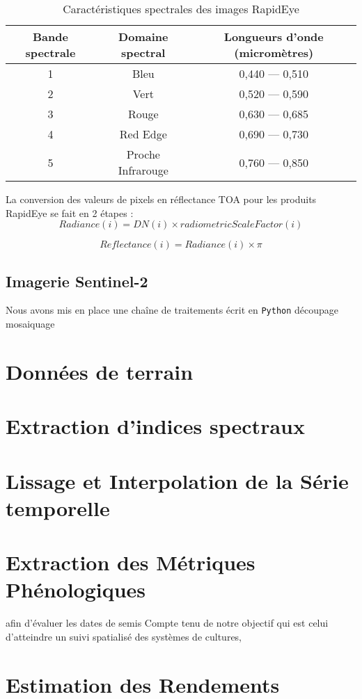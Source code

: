 \begin{table}
\begin{center}
\caption{Caractéristiques spectrales des images RapidEye}
\label{rapideye}
 \begin{tabular}{ccc}
  \hline
  Bande spectrale & Domaine spectral & Longueurs d'onde (micromètres)\\
  \hline
  1 & Bleu & 0,440 --- 0,510 \\
  2 & Vert & 0,520 --- 0,590 \\
  3 & Rouge & 0,630 --- 0,685 \\
  4 & Red Edge & 0,690 --- 0,730 \\ 
  5 & Proche Infrarouge & 0,760 --- 0,850 \\
  \hline
 \end{tabular}
\end{center}
\end{table}

La conversion des valeurs de pixels en réflectance TOA pour les produits RapidEye se fait en 2 étapes :
\[  Radiance (i) = DN(i) \times radiometricScaleFactor(i) \]

\[   Reflectance(i) = Radiance(i) \times \pi \]

  \subsection{Imagerie Sentinel-2}
 
\vspace{5mm}
 
Nous avons mis en place une chaîne de traitements écrit en \texttt{Python} découpage mosaiquage
  
\section{Données de terrain}
  
\section{Extraction d'indices spectraux}

\section{Lissage et Interpolation de la Série temporelle}

\section{Extraction des Métriques Phénologiques}
afin d'évaluer les dates de semis
Compte tenu de notre objectif qui est celui d'atteindre un suivi spatialisé des systèmes de cultures,

\section{Estimation des Rendements}